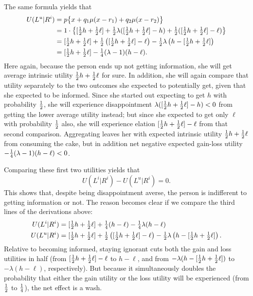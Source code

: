 The same formula yields that
\begin{align*}
  U(L^u|R^i)
&= p\bigl\{x + q_1\mu(x - r_1) + q_2\mu(x - r_2)\bigr\}
\\
&= 1\cdot\bigl\{[\tfrac{1}{2} h + \tfrac{1}{2} \ell] + \tfrac{1}{2}\lambda([\tfrac{1}{2} h + \tfrac{1}{2} \ell] -
h) + \tfrac{1}{2}([\tfrac{1}{2} h + \tfrac{1}{2} \ell] - \ell)\bigr\}\\
&= [\tfrac{1}{2} h + \tfrac{1}{2} \ell] +
   \tfrac{1}{2}\left([\tfrac{1}{2} h + \tfrac{1}{2} \ell] - \ell\right)
   -\tfrac{1}{2}\lambda\left(h - [\tfrac{1}{2} h + \tfrac{1}{2} \ell]\right)\\
&= [\tfrac{1}{2} h + \tfrac{1}{2} \ell] - \tfrac{1}{4}(\lambda-1)(h - \ell).
\end{align*}
Here again, because the person ends up not getting information, she will get
average intrinsic utility $\tfrac{1}{2} h + \tfrac{1}{2} \ell$ for sure. In addition, she
will again compare that utility separately to the two outcomes she expected to
potentially get, given that she expected to be informed. Since she started out
expecting to get $h$ with probability $\tfrac{1}{2}$, she will experience
disappointment $\lambda([\tfrac{1}{2} h + \tfrac{1}{2} \ell] - h) < 0$ from getting the
lower average utility instead; but since she expected to get only $\ell$ with
probability $\tfrac{1}{2}$ also, she will experience elation $[\tfrac{1}{2} h + \tfrac{1}{2}\ell] -
\ell$ from that second comparison. Aggregating leaves her with expected
intrinsic utility $\tfrac{1}{2} h + \tfrac{1}{2} \ell$ from consuming the cake, but in
addition net negative expected gain-loss utility $-\tfrac{1}{4}(\lambda - 1)(h -
\ell) < 0$.

Comparing these first two utilities yields that
\begin{equation*}
  U(L^i|R^i) - U(L^u|R^i) = 0.
\end{equation*}
This shows that, despite being disappointment averse, the person is indifferent
to getting information or not. The reason becomes clear if we compare the
third lines of the derivations above:
\begin{align*}
  U(L^i|R^i) &= [\tfrac{1}{2} h + \tfrac{1}{2} \ell] +
  \tfrac{1}{4} (h-\ell) - \tfrac{1}{4} \lambda(h-\ell)\\
  U(L^u|R^i) &= [\tfrac{1}{2} h + \tfrac{1}{2} \ell] +
  \tfrac{1}{2}\left([\tfrac{1}{2} h + \tfrac{1}{2} \ell] - \ell\right)
  -\tfrac{1}{2}\lambda\left(h - [\tfrac{1}{2} h + \tfrac{1}{2} \ell]\right).
\end{align*}
Relative to becoming informed, staying ignorant cuts both the gain and loss
utilities in half (from $[\tfrac{1}{2} h + \tfrac{1}{2} \ell] - \ell$ to $h - \ell$, and
from $-\lambda(h - [\tfrac{1}{2} h + \tfrac{1}{2} \ell])$ to $-\lambda(h - \ell)$,
respectively). But because it simultaneously doubles the probability that
either the gain utility or the loss utility will be experienced (from $\tfrac{1}{2}$
to $\tfrac{1}{4}$), the net effect is a wash.

